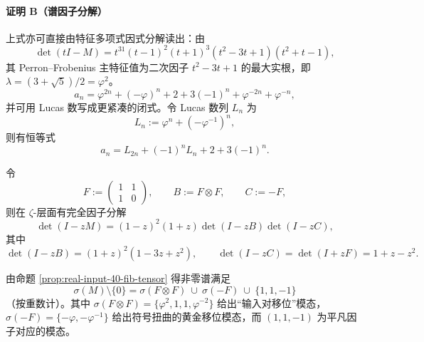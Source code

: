 \paragraph{证明 B（谱因子分解）}
上式亦可直接由特征多项式因式分解读出：由
\[
\det(tI-M)=t^{31}(t-1)^2(t+1)^3(t^2-3t+1)(t^2+t-1),
\]
其 Perron--Frobenius 主特征值为二次因子 $t^2-3t+1$ 的最大实根，即 $\lambda=(3+\sqrt5)/2=\varphi^2$。
\[
a_n=\varphi^{2n}+(-\varphi)^n+2+3(-1)^n+\varphi^{-2n}+\varphi^{-n},
\]
并可用 Lucas 数写成更紧凑的闭式。令 Lucas 数列 $L_n$ 为
\[
L_n:=\varphi^n+(-\varphi^{-1})^n,
\]
则有恒等式
\[
a_n=L_{2n}+(-1)^nL_n+2+3(-1)^n.
\]
\begin{proposition}\label{prop:real-input-40-fib-tensor}
令
\[
F:=\begin{pmatrix}1&1\\[2pt]1&0\end{pmatrix},\qquad
B:=F\otimes F,\qquad
C:=-F,
\]
则在 $\zeta$-层面有完全因子分解
\[
\det(I-zM)=(1-z)^2(1+z)\det(I-zB)\det(I-zC),
\]
其中
\[
\det(I-zB)=(1+z)^2(1-3z+z^2),\qquad
\det(I-zC)=\det(I+zF)=1+z-z^2.
\]
\end{proposition}

\begin{corollary}[谱分解的结构解释]\label{cor:real-input-40-spectrum-decomp}
由命题 \ref{prop:real-input-40-fib-tensor} 得非零谱满足
\[
\sigma(M)\setminus\{0\}
=\sigma(F\otimes F)\ \cup\ \sigma(-F)\ \cup\ \{1,1,-1\}
\]
（按重数计）。其中 $\sigma(F\otimes F)=\{\varphi^2,1,1,\varphi^{-2}\}$ 给出“输入对移位”模态，$\sigma(-F)=\{-\varphi,-\varphi^{-1}\}$ 给出符号扭曲的黄金移位模态，而 $(1,1,-1)$ 为平凡因子对应的模态。
\end{corollary}

